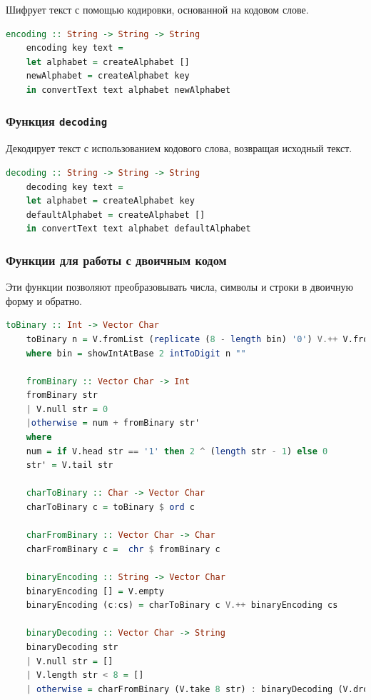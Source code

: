 \documentclass[10pt,a4paper,final]{article} %
\begin{document}
Шифрует текст с помощью кодировки, основанной на кодовом слове.

\begin{lstlisting}[language=Haskell, caption=Функция шифрования]
	encoding :: String -> String -> String
	encoding key text =
	let alphabet = createAlphabet [] 
	newAlphabet = createAlphabet key
	in convertText text alphabet newAlphabet
\end{lstlisting}

\subsubsection{Функция \texttt{decoding}}

Декодирует текст с использованием кодового слова, возвращая исходный текст.

\begin{lstlisting}[language=Haskell, caption=Функция декодирования]
	decoding :: String -> String -> String
	decoding key text = 
	let alphabet = createAlphabet key
	defaultAlphabet = createAlphabet []
	in convertText text alphabet defaultAlphabet 
\end{lstlisting}

\subsubsection{Функции для работы с двоичным кодом}

Эти функции позволяют преобразовывать числа, символы и строки в двоичную форму и обратно.

\begin{lstlisting}[language=Haskell, caption=Функции для работы с двоичным кодом]
	toBinary :: Int -> Vector Char 
	toBinary n = V.fromList (replicate (8 - length bin) '0') V.++ V.fromList bin
	where bin = showIntAtBase 2 intToDigit n ""
	
	fromBinary :: Vector Char -> Int 
	fromBinary str 
	| V.null str = 0 
	|otherwise = num + fromBinary str'
	where 
	num = if V.head str == '1' then 2 ^ (length str - 1) else 0 
	str' = V.tail str
	
	charToBinary :: Char -> Vector Char
	charToBinary c = toBinary $ ord c
	
	charFromBinary :: Vector Char -> Char
	charFromBinary c =  chr $ fromBinary c 
	
	binaryEncoding :: String -> Vector Char
	binaryEncoding [] = V.empty
	binaryEncoding (c:cs) = charToBinary c V.++ binaryEncoding cs
	
	binaryDecoding :: Vector Char -> String
	binaryDecoding str
	| V.null str = []
	| V.length str < 8 = []
	| otherwise = charFromBinary (V.take 8 str) : binaryDecoding (V.drop 8 str)
\end{lstlisting}
\end{document}
